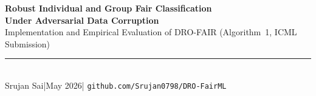 \documentclass[11pt,a4paper]{article}
\begin{document}
\begin{center}
  \vspace*{0.6cm}
  {\LARGE\bfseries\color{hdrblue}
    Robust Individual and Group Fair Classification\\[0.3em]
    Under Adversarial Data Corruption}\\[0.7em]
  {\large Implementation and Empirical Evaluation of DRO-FAIR (Algorithm~1, ICML Submission)}\\[0.4em]
  \textcolor{gray}{\rule{0.6\textwidth}{0.6pt}}\\[0.3em]
  {\normalsize Srujan Sai\quad|\quad May 2026\quad|\quad
    \texttt{github.com/Srujan0798/DRO-FairML}}
  \vspace{0.3cm}
\end{center}
\end{document}
